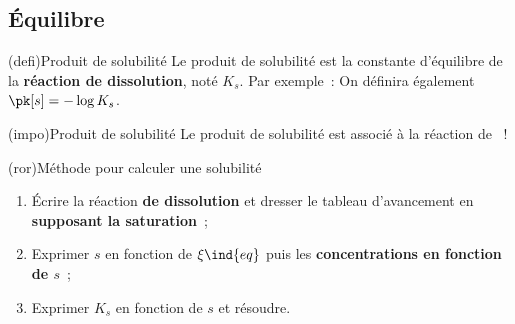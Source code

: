\documentclass[../../main/main.tex]{subfiles}
\begin{document}
\subsection{Équilibre}
\begin{tcb*}(defi){Produit de solubilité}
	Le produit de solubilité est la constante d'équilibre de la \textbf{réaction
		de dissolution}, noté $K_s$. Par exemple~:
	\vspace{-15pt}
	On définira également $\pk[s] = - \log K_s$.
\end{tcb*}

\begin{tcb*}(impo){Produit de solubilité}
	Le produit de solubilité est associé à la réaction de ~!
\end{tcb*}

\begin{tcb*}(ror){Méthode pour calculer une solubilité}
	\begin{enumerate}[label=\sqenumi]
		\item Écrire la réaction \textbf{de dissolution} et dresser le tableau
		      d'avancement en \textbf{supposant la saturation}~;
		\item Exprimer $s$ en fonction de $\xi\ind{eq}$ puis
		      les \textbf{concentrations en fonction de $s$}~;
		\item Exprimer $K_s$ en fonction de $s$ et résoudre.
	\end{enumerate}
\end{tcb*}
\end{document}
